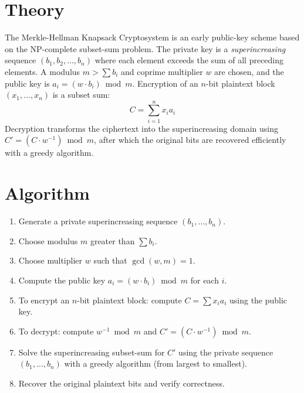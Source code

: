 \section{Theory}
The Merkle-Hellman Knapsack Cryptosystem is an early public-key scheme based
on the NP-complete subset-sum problem. The private key is a \emph{superincreasing}
sequence $(b_1, b_2, \dots, b_n)$ where each element exceeds the sum of all
preceding elements. A modulus $m > \sum b_i$ and coprime multiplier $w$ are
chosen, and the public key is $a_i = (w \cdot b_i) \bmod m$. Encryption of
an $n$-bit plaintext block $(x_1, \dots, x_n)$ is a subset sum:
\[
C = \sum_{i=1}^{n} x_i a_i
\]
Decryption transforms the ciphertext into the superincreasing domain using
$C' = (C \cdot w^{-1}) \bmod m$, after which the original bits are recovered
efficiently with a greedy algorithm.

\section{Algorithm}
\begin{enumerate}
  \item Generate a private superincreasing sequence $(b_1, \dots, b_n)$.
  \item Choose modulus $m$ greater than $\sum b_i$.
  \item Choose multiplier $w$ such that $\gcd(w, m) = 1$.
  \item Compute the public key $a_i = (w \cdot b_i) \bmod m$ for each $i$.
  \item To encrypt an $n$-bit plaintext block: compute $C = \sum x_i a_i$ using the public key.
  \item To decrypt: compute $w^{-1} \bmod m$ and $C' = (C \cdot w^{-1}) \bmod m$.
  \item Solve the superincreasing subset-sum for $C'$ using the private sequence $(b_1,\dots,b_n)$ with a greedy algorithm (from largest to smallest).
  \item Recover the original plaintext bits and verify correctness.
\end{enumerate}

